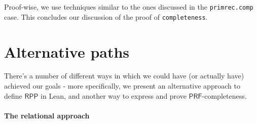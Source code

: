\documentclass[oneside]{book}
\theoremstyle{definition}
\theoremstyle{remark}
\theoremstyle{plain}
\newcommand{\RPP}{\mathsf{RPP}}
\newcommand{\PRF}{\mathsf{PRF}}
\begin{document}
Proof-wise, we use techniques similar to the ones discussed in the \lstinline{primrec.comp} case.
This concludes our discussion of the proof of \lstinline{completeness}.

\newpage
\section{Alternative paths} \label{alternatives}

There's a number of different ways in which we could have (or actually have) achieved our goals -
more specifically, we present an alternative approach to define $\RPP$ in Lean, and another way to express and
prove $\PRF$-completeness.

\paragraph{The relational approach}
\end{document}
